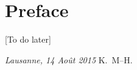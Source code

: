 \chapter*{Preface}
[To do later]


\bigskip
 
\noindent\textit{Lausanne, 14 Ao\^{u}t 2015}
\hfill K.~M--H.
